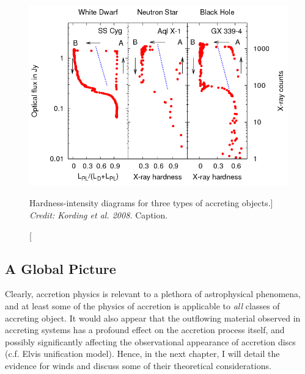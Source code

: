 \begin{figure}
\centering
\includegraphics[width=1.0\textwidth]{figures/01-intro/kording_hid.png}
\caption
[Hardness-intensity diagrams for three types of accreting objects.]
{
{\sl Credit: Kording et al. 2008.} 
Caption.
} 
\label{fig:kording_hid}
\end{figure}

\subsection{A Global Picture}

Clearly, accretion physics is relevant to a plethora of astrophysical phenomena, 
and at least some of the physics of accretion is applicable to {\em all} 
classes of accreting object. 
It would also appear that the outflowing material observed in accreting systems 
has a profound effect on the accretion process itself, and 
possibly significantly affecting the observational 
appearance of accretion discs (c.f. Elvis unification model). 
Hence, in the next chapter, I will detail the evidence for
winds and discuss some of their theoretical considerations.

